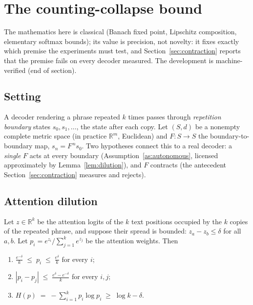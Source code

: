 \section{The counting-collapse bound}
\label{sec:theory}

The mathematics here is classical (Banach fixed point, Lipschitz
composition, elementary softmax bounds); its value is precision, not
novelty: it fixes exactly which premise the experiments must test, and
Section~\ref{sec:contraction} reports that the premise fails on every
decoder measured. The development is machine-verified (end of section).

\subsection{Setting}

A decoder rendering a phrase repeated $k$ times passes through
\emph{repetition boundary} states $s_0, s_1, \dots$, the state after
each copy. Let $(S,d)$ be a nonempty complete metric space (in practice
$\mathbb{R}^m$, Euclidean) and $F \colon S \to S$ the boundary-to-boundary
map, $s_n = F^{\,n} s_0$. Two hypotheses connect this to a real decoder:
a \emph{single} $F$ acts at every boundary (Assumption~\ref{as:autonomous},
licensed approximately by Lemma~\ref{lem:dilution}), and $F$ contracts
(the antecedent Section~\ref{sec:contraction} measures and rejects).

\subsection{Attention dilution}

\begin{lemma}
\label{lem:dilution}
Let $z \in \mathbb{R}^k$ be the attention logits of the $k$ text positions
occupied by the $k$ copies of the repeated phrase, and suppose their
spread is bounded: $z_a - z_b \le \delta$ for all $a, b$. Let
$p_i = e^{z_i} / \sum_{j=1}^{k} e^{z_j}$ be the attention weights. Then
\begin{enumerate}
\item[(i)] $\displaystyle \frac{e^{-\delta}}{k} \;\le\; p_i \;\le\;
      \frac{e^{\delta}}{k}$ \quad for every $i$;
\item[(ii)] $\displaystyle |p_i - p_j| \;\le\;
      \frac{e^{\delta} - e^{-\delta}}{k}$ \quad for every $i, j$;
\item[(iii)] $\displaystyle H(p) \;=\; -\sum_{i=1}^{k} p_i \log p_i
      \;\ge\; \log k - \delta$.
\end{enumerate}
\end{lemma}

